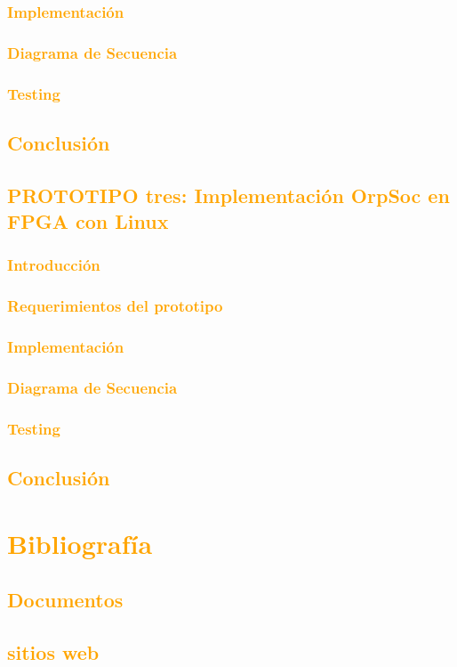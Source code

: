 \documentclass[a4paper,11pt]{article}
\begin{document}
		\subsubsection{\textcolor{orange}{Implementación}}
			\subsubsection{\textcolor{orange}{Diagrama de Secuencia}}
			\subsubsection{\textcolor{orange}{Testing}}
		\subsection{\textcolor{orange}{Conclusión}}
	\subsection{\textcolor{orange}{PROTOTIPO tres: Implementación OrpSoc en FPGA con Linux}}
		\subsubsection{\textcolor{orange}{Introducción}}
		\subsubsection{\textcolor{orange}{Requerimientos del prototipo}}
		\subsubsection{\textcolor{orange}{Implementación}}
			\subsubsection{\textcolor{orange}{Diagrama de Secuencia}}
			\subsubsection{\textcolor{orange}{Testing}}
		\subsection{\textcolor{orange}{Conclusión}}




	


\section{\textcolor{orange}{Bibliografía}}
\subsection{\textcolor{orange}{Documentos}}
\subsection{\textcolor{orange}{sitios web}}
\end{document}
